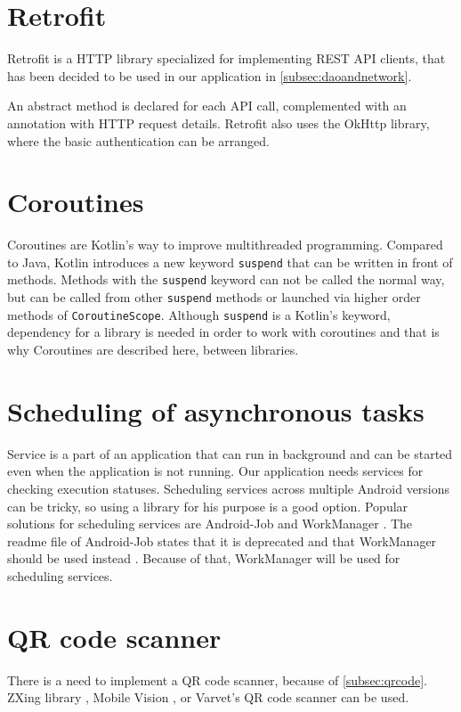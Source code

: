 \section{Retrofit}
Retrofit is a HTTP library specialized for implementing REST API clients, that has been decided to be used in our application in \autoref{subsec:daoandnetwork}.

An abstract method is declared for each API call, complemented with an annotation with HTTP request details.
Retrofit also uses the OkHttp \cite{okhttp} library, where the basic authentication can be arranged.

\section{Coroutines}
Coroutines are Kotlin's way to improve multithreaded programming.
Compared to Java, Kotlin introduces a new keyword \verb|suspend| that can be written in front of methods.
Methods with the \verb|suspend| keyword can not be called the normal way, but can be called from other \verb|suspend| methods or launched via higher order methods of \verb|CoroutineScope|.
Although \verb|suspend| is a Kotlin's keyword, dependency for a library is needed in order to work with coroutines and that is why Coroutines are described here, between libraries.

\section{Scheduling of asynchronous tasks}
Service is a part of an application that can run in background and can be started even when the application is not running.
Our application needs services for checking execution statuses.
Scheduling services across multiple Android versions can be tricky, so using a library for his purpose is a good option.
Popular solutions for scheduling services are Android-Job \cite{androidjob} and WorkManager \cite{workmanager}.
The readme file of Android-Job states that it is deprecated and that WorkManager should be used instead \cite{androidjob}.
Because of that, WorkManager will be used for scheduling services.

\section{QR code scanner}
There is a need to implement a QR code scanner, because of \autoref{subsec:qrcode}.
ZXing library \cite{zxing}, Mobile Vision \cite{vision}, or Varvet's QR code scanner \cite{varvet} can be used.

